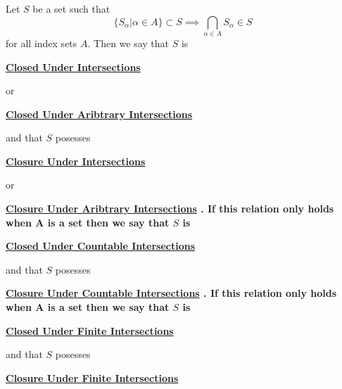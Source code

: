 \newcommand{\ClosureUnderFiniteIntersections}[0]{
    \bf \hyperref[def:ClosureUnderIntersection]{Closure Under Finite Intersections} \rm
}
\newcommand{\ClosureUnderCountableIntersections}[0]{
    \bf \hyperref[def:ClosureUnderIntersection]{Closure Under Countable Intersections} \rm
}
\newcommand{\ClosureUnderIntersections}[0]{
    \bf \hyperref[def:ClosureUnderIntersection]{Closure Under Intersections} \rm
}
\newcommand{\ClosureUnderArbitraryIntersections}[0]{
    \bf \hyperref[def:ClosureUnderIntersection]{Closure Under Aribtrary Intersections} \rm
}
\newcommand{\ClosedUnderFiniteIntersections}[0]{
    \bf \hyperref[def:ClosureUnderIntersection]{Closed Under Finite Intersections} \rm
}
\newcommand{\ClosedUnderCountableIntersections}[0]{
    \bf \hyperref[def:ClosureUnderIntersection]{Closed Under Countable Intersections} \rm
}
\newcommand{\ClosedUnderIntersections}[0]{
    \bf \hyperref[def:ClosureUnderIntersection]{Closed Under Intersections} \rm
}
\newcommand{\ClosedUnderArbitraryIntersections}[0]{
    \bf \hyperref[def:ClosureUnderIntersection]{Closed Under Aribtrary Intersections} \rm
}\begin{df}
\label{def:ClosureUnderIntersection}
\rm
    Let $S$ be a set such that 
    \begin{equation*}
    \{ S_\alpha | \alpha \in A\} \subset S \implies \bigcap_{\alpha \in A} S_{\alpha}   \in S
    \end{equation*}
    for all index sets $A$. 
    Then we say that $S$ is 
    \ClosedUnderIntersections
    or
    \ClosedUnderArbitraryIntersections
    and that $S$ posesses 
    \ClosureUnderIntersections
    or
    \ClosureUnderArbitraryIntersections.
    If this relation only holds when A is a 
    \Countable set then we say that 
    $S$ is 
    \ClosedUnderCountableIntersections
    and that $S$ posesses
    \ClosureUnderCountableIntersections. 
    If this relation only holds when A is a 
    \Finite set then we say that 
    $S$ is 
    \ClosedUnderFiniteIntersections
    and that $S$ posesses
    \ClosureUnderFiniteIntersections    
\end{df}
